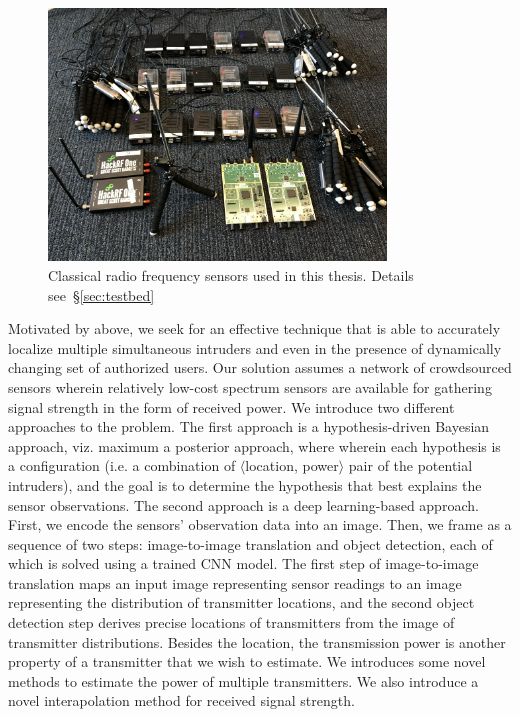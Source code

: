 \begin{figure}[t]
      \centering
      \includegraphics[width=0.8\textwidth]{figures/SDR.png}
      \caption{Classical radio frequency sensors used in this thesis. Details see~\S\ref{sec:testbed}} 
      \label{fig:intro-sdr}
\end{figure}



Motivated by above, we seek for an effective technique that is able to accurately localize multiple simultaneous
intruders and even in the presence of dynamically changing set of authorized users.
Our solution assumes a network of crowdsourced sensors wherein relatively low-cost spectrum sensors are available
for gathering signal strength in the form of received power.
We introduce two different approaches to the \mtl problem.
The first approach is a hypothesis-driven Bayesian approach, viz. maximum a posterior approach, where wherein each hypothesis is a configuration
(i.e. a combination of $\langle$location, power$\rangle$ pair of the potential intruders), and the goal is to determine the hypothesis 
that best explains the sensor observations.
The second approach is a deep learning-based approach. First, we encode the sensors' observation data into an image.
Then, we frame \mtl as a sequence of two steps: image-to-image translation 
and object detection, each of which is solved using a trained CNN model. 
The first step of image-to-image translation maps an input image representing sensor readings to an image
representing the distribution of transmitter locations, and the second object detection step derives precise locations of
transmitters from the image of transmitter distributions. 
Besides the location, the transmission power is another property of a transmitter that we wish to estimate.
We introduces some novel methods to estimate the power of multiple transmitters.
We also introduce a novel interapolation method for received signal strength.


